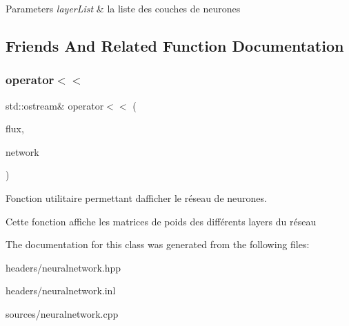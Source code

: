 \begin{DoxyParams}{Parameters}
{\em layer\+List} & la liste des couches de neurones \\
\hline
\end{DoxyParams}


\subsection{Friends And Related Function Documentation}
\mbox{\label{classNeuralNetwork_a0ecebf9a494437efb917804ed271e13f}} 
\subsubsection{\texorpdfstring{operator$<$$<$}{operator<<}}
{\footnotesize\ttfamily std\+::ostream\& operator$<$$<$ (\begin{DoxyParamCaption}\item[{std\+::ostream \&}]{flux,  }\item[{\hyperlink{classNeuralNetwork}{Neural\+Network}}]{network }\end{DoxyParamCaption})\hspace{0.3cm}{\ttfamily [friend]}}



Fonction utilitaire permettant d\textquotesingle{}afficher le réseau de neurones. 

Cette fonction affiche les matrices de poids des différents layers du réseau 

The documentation for this class was generated from the following files\+:\begin{DoxyCompactItemize}
\item 
headers/neuralnetwork.\+hpp\item 
headers/neuralnetwork.\+inl\item 
sources/neuralnetwork.\+cpp\end{DoxyCompactItemize}
